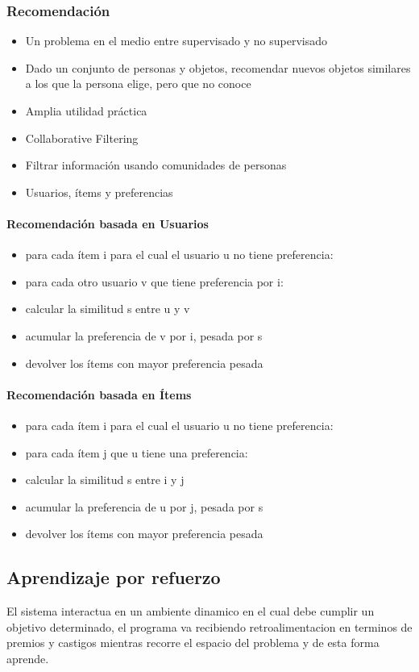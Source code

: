 \documentclass[a4paper,11pt,spanish]{book}
\begin{document}
      \subsubsection {Recomendación}
	\begin{itemize}
	  \item Un problema en el medio entre supervisado y no supervisado
	  \item Dado un conjunto de personas y objetos, recomendar nuevos objetos similares a los que la persona elige, pero que no conoce
	  \item Amplia utilidad práctica
	  \item Collaborative Filtering
	  \item Filtrar información usando comunidades de personas
	  \item Usuarios, ítems y preferencias
	\end{itemize}
      \paragraph {Recomendación basada en Usuarios}
	\begin{itemize}
	  \item para cada ítem i para el cual el usuario u no tiene preferencia:
	  \item para cada otro usuario v que tiene preferencia por i:
	  \item calcular la similitud s entre u y v
	  \item acumular la preferencia de v por i, pesada por s
	  \item devolver los ítems con mayor preferencia pesada
	\end{itemize}
      \paragraph {Recomendación basada en Ítems}
	\begin{itemize}
	  \item para cada ítem i para el cual el usuario u no tiene preferencia:
	  \item para cada ítem j que u tiene una preferencia:
	  \item calcular la similitud s entre i y j
	  \item acumular la preferencia de u por j, pesada por s
	  \item devolver los ítems con mayor preferencia pesada
	\end{itemize}
    
    \subsection{Aprendizaje por refuerzo}
      El sistema interactua en un ambiente dinamico en el cual debe cumplir un objetivo determinado, el programa va recibiendo retroalimentacion en terminos de premios y castigos mientras 
      recorre el espacio del problema y de esta forma aprende.
\end{document}
